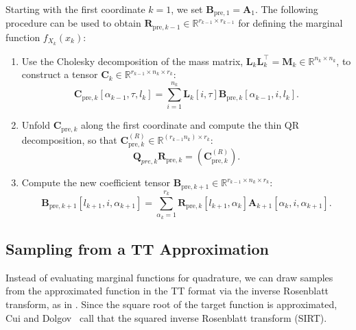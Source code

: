 \begin{prop}
	\label{prob:ForMarg}
	Starting with the first coordinate $k = 1$, we set $\bm{B}_{\text{pre},1} = \bm{A}_1$. The following procedure can be used to obtain $\bm{R}_{\text{pre},k-1} \in \mathbb{R}^{r_{k-1}  \times r_{k-1}}$ for defining the marginal function $f_{X_k}(x_k)$:
	\begin{enumerate}
		\item Use the Cholesky decomposition of the mass matrix, $\bm{L}_k \bm{L}_k^\top = \bm{M}_k \in \mathbb{R}^{n_k \times n_k}$, to construct a tensor $\bm{C}_k \in \mathbb{R}^{r_{k-1} \times n_k \times r_k}$:
		\begin{equation}
			\bm{C}_{\text{pre},k}[\alpha_{k-1}, \tau, l_k] = \sum_{i=1}^{n_k} \bm{L}_k[i, \tau] \bm{B}_{\text{pre},k}[\alpha_{k-1}, i, l_k] .\label{eq:constrCForw}
		\end{equation}
		\item Unfold $\bm{C}_{\text{pre},k}$ along the first coordinate and compute the thin QR decomposition, so that $\bm{C}_{\text{pre},k}^{(R)} \in \mathbb{R}^{(r_{k-1} n_k ) \times r_k}$:
		\begin{equation}
			\bm{Q}_{pre,k}\bm{R}_{\text{pre},k} = {(\bm{C}_{\text{pre},k}^{(R)})}.\label{eq:thinQRForw}
		\end{equation}
		\item Compute the new coefficient tensor $\bm{B}_{\text{pre}, k+1} \in \mathbb{R}^{r_{k-1} \times n_k \times r_k} $:
		\begin{equation}
			\bm{B}_{\text{pre}, k+1}[l_{k+1}, i, \alpha_{k+1}] = \sum_{\alpha_{k}=1}^{r_{k}} \bm{R}_{\text{pre},k}[l_{k+1}, \alpha_{k}] \bm{A}_{k+1}[\alpha_{k}, i, \alpha_{k+1}] .\label{eq:nextCoeffTForw}
		\end{equation}
	\end{enumerate}
\end{prop}


\subsection{Sampling from a TT Approximation}
\label{subsec:SamplTT}
Instead of evaluating marginal functions for quadrature, we can draw samples from the approximated function in the TT format via the inverse Rosenblatt transform, as in \cite{dolgov2020approximation}.
Since the square root of the target function is approximated, Cui and Dolgov~\cite{cui2022deep} call that the squared inverse Rosenblatt transform (SIRT).

